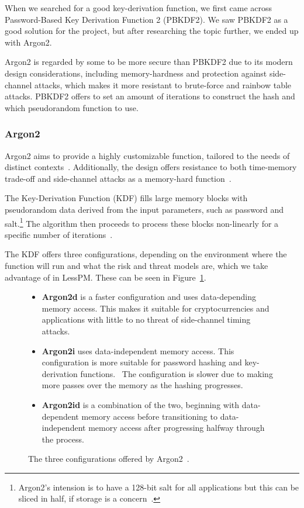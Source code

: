 
When we searched for a good key-derivation function, we first came across
Password-Based Key Derivation Function 2 (PBKDF2).
We saw PBKDF2 as a good solution for the project, but after researching the
topic further, we ended up with Argon2.

Argon2 is regarded by some to be more secure than PBKDF2 due to its modern
design considerations, including memory-hardness and protection against
side-channel attacks, which makes it more resistant to brute-force and rainbow
table attacks.
PBKDF2 offers to set an amount of iterations to construct the hash and which
pseudorandom function to use.

\subsubsection{Argon2}
Argon2 aims to provide a highly customizable function, tailored to the needs
of distinct contexts~\cite{argon2specs}.
Additionally, the design offers resistance to both time-memory trade-off
and side-channel attacks as a memory-hard function~\cite{argon2specs}.

The Key-Derivation Function (KDF) fills large memory blocks with pseudorandom
data derived from the input parameters, such as password and salt.\footnote{
  Argon2's intension is to have a 128-bit salt for all applications but this
  can be sliced in half, if storage is a concern~\cite{argon2specs}.
}
The algorithm then proceeds to process these blocks non-linearly for a specific
number of iterations~\cite{argon2specs}.

The KDF offers three configurations, depending on the environment where
the function will run and what the risk and threat models are, which we take
advantage of in LessPM\@.
These can be seen in Figure~\ref{fig:argon2conf}.

\begin{figure}[htbp]
  \centering
  \begin{itemize}
    \item \textbf{Argon2d} is a faster configuration and uses data-depending
    memory access.
    This makes it suitable for cryptocurrencies and applications with little to
    no threat of side-channel timing attacks.\protect\footnotemark
    \item \textbf{Argon2i} uses data-independent memory access.
    This configuration is more suitable for password hashing and key-derivation
    functions.\protect\footnotemark
    ~The configuration is slower due to making more passes over the memory as
    the hashing progresses.
    \item \textbf{Argon2id} is a combination of the two, beginning with
    data-dependent memory access before transitioning to data-independent
    memory access after progressing halfway through the process.
  \end{itemize}
  \caption{The three configurations offered by Argon2~\cite{argon2specs}.}
  \label{fig:argon2conf}
\end{figure}

